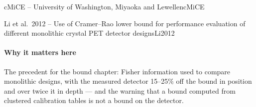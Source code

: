 \begin{programnote}{cMiCE -- University of Washington, Miyaoka and Lewellen}{cMiCE}
\begin{papernote}{Li et al.\ 2012 -- Use of Cramer--Rao lower bound for performance evaluation of different monolithic crystal PET detector designs}{Li2012}
\paragraph{Why it matters here}
The precedent for the bound chapter: Fisher information used to compare
monolithic designs, with the measured detector 15--25\% off the bound in
position and over twice it in depth --- and the warning that a bound computed
from clustered calibration tables is not a bound on the detector.

\end{papernote}

\end{programnote}



